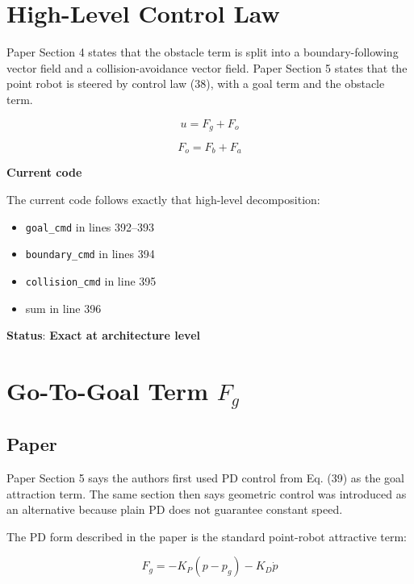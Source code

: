 \documentclass[11pt]{article}
\begin{document}
\section*{High-Level Control Law}

Paper Section 4 states that the obstacle term is split into a
boundary-following vector field and a collision-avoidance vector field. Paper
Section 5 states that the point robot is steered by control law (38), with a
goal term and the obstacle term.

\begin{equation}
u = F_g + F_o
\end{equation}

\begin{equation}
F_o = F_b + F_a
\end{equation}

\textbf{Current code}

The current code follows exactly that high-level decomposition:

\begin{itemize}[leftmargin=*]
  \item \texttt{goal\_cmd} in lines 392--393
  \item \texttt{boundary\_cmd} in lines 394
  \item \texttt{collision\_cmd} in line 395
  \item sum in line 396
\end{itemize}

\textbf{Status}: \textbf{Exact at architecture level}

\section*{Go-To-Goal Term \(F_g\)}

\subsection*{Paper}

Paper Section 5 says the authors first used PD control from Eq. (39) as the
goal attraction term. The same section then says geometric control was
introduced as an alternative because plain PD does not guarantee constant speed.

The PD form described in the paper is the standard point-robot attractive term:

\begin{equation}
F_g = -K_P (p - p_g) - K_D \dot{p}
\end{equation}
\end{document}
